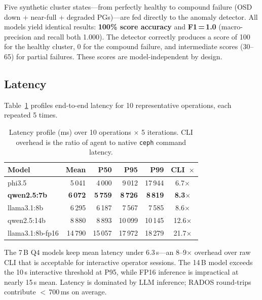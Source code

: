 \documentclass[sigplan,nonacm,10pt]{acmart}
\begin{document}
Five synthetic cluster states---from perfectly healthy to compound
failure (OSD down + near-full + degraded PGs)---are fed directly to
the anomaly detector.  All models yield identical results:
\textbf{100\% score accuracy} and \textbf{F1\,=\,1.0}
(macro-precision and recall both 1.000).
The detector correctly produces a score of 100 for the healthy
cluster, 0 for the compound failure, and intermediate scores
(30--65) for partial failures.
These scores are model-independent by design.

\subsection{Latency}\label{ss:latency}

Table~\ref{tab:latency} profiles end-to-end latency for 10
representative operations, each repeated 5 times.

\begin{table}[t]
\centering\small
\caption{Latency profile (ms) over 10 operations $\times$ 5
iterations.  CLI overhead is the ratio of agent to native \texttt{ceph} command latency.}
\label{tab:latency}
\begin{tabular}{@{}lrrrrc@{}}
\toprule
\textbf{Model} & \textbf{Mean} & \textbf{P50} & \textbf{P95} & \textbf{P99} & \textbf{CLI~$\times$} \\
\midrule
phi3.5        & 5\,041 & 4\,000 & 9\,012 & 17\,944 & 6.7$\times$ \\
\textbf{qwen2.5:7b}   & \textbf{6\,072} & \textbf{5\,759} & \textbf{8\,726} & \textbf{8\,819}  & \textbf{8.3$\times$} \\
llama3.1:8b   & 6\,295 & 6\,187 & 7\,567 & 7\,585  & 8.6$\times$ \\
qwen2.5:14b   & 8\,880 & 8\,893 & 10\,099 & 10\,145 & 12.6$\times$ \\
llama3.1:8b-fp16 & 14\,790 & 15\,057 & 17\,972 & 18\,279 & 21.7$\times$ \\
\bottomrule
\end{tabular}
\end{table}

The 7\,B Q4 models keep mean latency under 6.3\,s---an
8--9$\times$ overhead over raw CLI that is acceptable for
interactive operator sessions.
The 14\,B model exceeds the 10\,s interactive threshold at P95,
while FP16 inference is impractical at nearly 15\,s mean.
Latency is dominated by LLM inference;
RADOS round-trips contribute $<$\,700\,ms on average.
\end{document}
